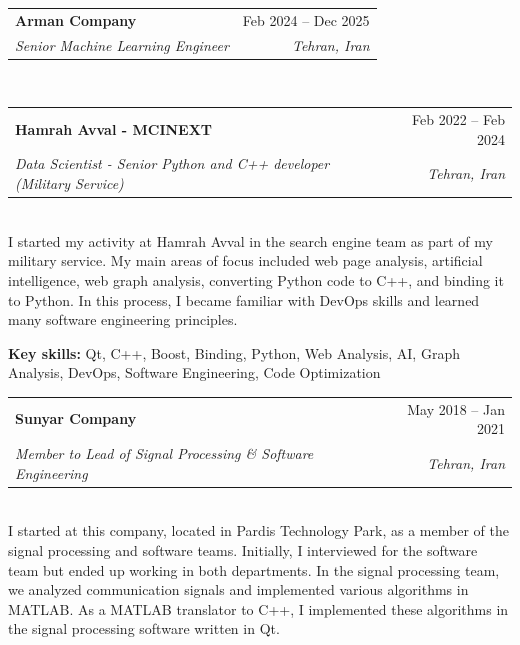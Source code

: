 \documentclass[a4paper,11pt]{article}
\makeatletter
\newcommand{\resumeQuadHeading}[4]{
\item
\begin{tabular*}{\linewidth}[t]{l@{\extracolsep{\fill}}r}
\textbf{#1} & #2 \\
\textit{\small#3} & \textit{\small #4} \\
\end{tabular*}
}
\makeatother
\begin{document}

\resumeQuadHeading{\faBuilding\hspace{3pt} Arman Company}{Feb 2024 -- Dec 2025}
{Senior Machine Learning Engineer}{Tehran, Iran}\\



\resumeQuadHeading{\faBuilding\hspace{3pt} Hamrah Avval - MCINEXT}{Feb 2022 -- Feb 2024} %
{Data Scientist - Senior Python and C++ developer (Military Service)}{Tehran, Iran}\\
{ 
I started my activity at Hamrah Avval in the search engine team as part of my military service. My main areas of focus included web page analysis, artificial intelligence, web graph analysis, converting Python code to C++, and binding it to Python. In this process, I became familiar with DevOps skills and learned many software engineering principles.
} 

{\textbf{Key skills:} Qt, C++, Boost, Binding, Python, Web Analysis, AI, Graph Analysis, DevOps, Software Engineering, Code Optimization} %

\resumeQuadHeading{\faBuilding\hspace{3pt} Sunyar Company}{May 2018 -- Jan 2021}
{Member to Lead of Signal Processing \& Software Engineering}{Tehran, Iran}\\
I started at this company, located in Pardis Technology Park, as a member of the signal processing and software teams. Initially, I interviewed for the software team but ended up working in both departments. In the signal processing team, we analyzed communication signals and implemented various algorithms in MATLAB. As a MATLAB translator to C++, I implemented these algorithms in the signal processing software written in Qt.
\end{document}
